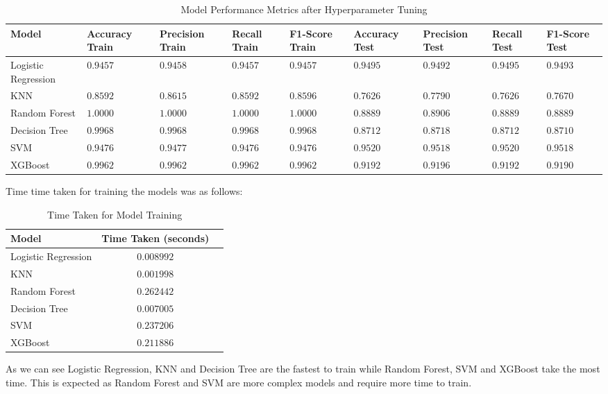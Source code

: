 \documentclass[12pt]{report}
\begin{document}
\begin{table}[H]
	\centering
	\begin{tabular}{p{2.5cm}p{1.5cm}p{1.5cm}p{1.5cm}p{1.5cm}p{1.5cm}p{1.5cm}p{1cm}p{1cm}}
	\toprule
	\textbf{Model} & \textbf{Accuracy Train} & \textbf{Precision Train} & \textbf{Recall Train} & \textbf{F1-Score Train} & \textbf{Accuracy Test} & \textbf{Precision Test} & \textbf{Recall Test} & \textbf{F1-Score Test} \\
	\toprule
	Logistic Regression & $0.9457$ & $0.9458$ & $0.9457$ & $0.9457$ & $0.9495$ & $0.9492$ & $0.9495$ & $0.9493$ \\
	\midrule
	KNN & $0.8592$ & $0.8615$ & $0.8592$ & $0.8596$ & $0.7626$ & $0.7790$ & $0.7626$ & $0.7670$ \\
	\midrule
	Random Forest & $1.0000$ & $1.0000$ & $1.0000$ & $1.0000$ & $0.8889$ & $0.8906$ & $0.8889$ & $0.8889$ \\
	\midrule
	Decision Tree & $0.9968$ & $0.9968$ & $0.9968$ & $0.9968$ & $0.8712$ & $0.8718$ & $0.8712$ & $0.8710$ \\
	\midrule
	SVM & $0.9476$ & $0.9477$ & $0.9476$ & $0.9476$ & $0.9520$ & $0.9518$ & $0.9520$ & $0.9518$ \\
	\midrule
	XGBoost & $0.9962$ & $0.9962$ & $0.9962$ & $0.9962$ & $0.9192$ & $0.9196$ & $0.9192$ & $0.9190$ \\
	\toprule
	\end{tabular}
	\caption{Model Performance Metrics after Hyperparameter Tuning}
	\label{tab:tuned_per_mat}
\end{table}

Time time taken for training the models was as follows:
\begin{table}[H]
	\centering
	\begin{tabular}{lcc}
	\toprule
	\textbf{Model} & \textbf{Time Taken (seconds)} \\
	\toprule
	Logistic Regression & $0.008992$ \\
	\midrule
	KNN & $0.001998$ \\
	\midrule
	Random Forest & $0.262442$ \\
	\midrule
	Decision Tree & $0.007005$ \\
	\midrule
	SVM & $0.237206$ \\
	\midrule
	XGBoost & $0.211886$ \\
	\toprule
	\end{tabular}
	\caption{Time Taken for Model Training}
	\label{tab:time_taken}
\end{table}
As we can see Logistic Regression, KNN and Decision Tree are the fastest to train while Random Forest, SVM and XGBoost take the most time. This is expected as Random Forest and SVM are more complex models and require more time to train.
\end{document}
